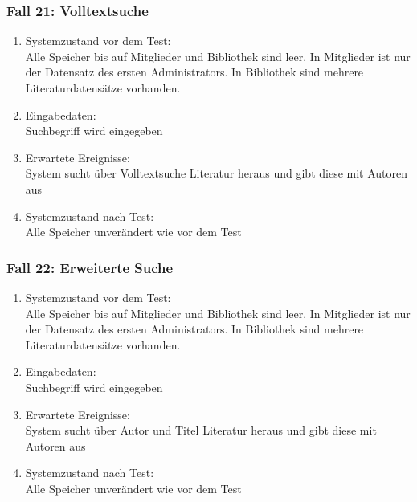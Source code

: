 \subsubsection{Fall 21: Volltextsuche}
\begin{enumerate}
\item Systemzustand vor dem Test:\\
	Alle Speicher bis auf Mitglieder und Bibliothek sind leer. In Mitglieder ist nur der Datensatz des ersten Administrators. In Bibliothek sind mehrere Literaturdatensätze vorhanden.
\item Eingabedaten:\\
	Suchbegriff wird eingegeben
\item Erwartete Ereignisse:\\
	System sucht über Volltextsuche Literatur heraus und gibt diese mit Autoren aus
\item Systemzustand nach Test:\\
	Alle Speicher unverändert wie vor dem Test
\end{enumerate}

\subsubsection{Fall 22: Erweiterte Suche}
\begin{enumerate}
\item Systemzustand vor dem Test:\\
	Alle Speicher bis auf Mitglieder und Bibliothek sind leer. In Mitglieder ist nur der Datensatz des ersten Administrators. In Bibliothek sind mehrere Literaturdatensätze vorhanden.
\item Eingabedaten:\\
	Suchbegriff wird eingegeben
\item Erwartete Ereignisse:\\
	System sucht über Autor und Titel Literatur heraus und gibt diese mit Autoren aus
\item Systemzustand nach Test:\\
	Alle Speicher unverändert wie vor dem Test
\end{enumerate}

